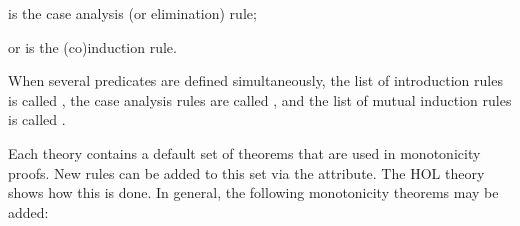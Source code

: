 \begin{isabellebody}
\begin{isamarkuptext}
\begin{description}
  \item {} is the case analysis (or elimination) rule;

  \item {} or  is the (co)induction
  rule.

  \end{description}

  When several predicates  are
  defined simultaneously, the list of introduction rules is called
  , the case analysis rules are
  called , and the list
  of mutual induction rules is called .%
\end{isamarkuptext}%
\isamarkuptrue%
%
\isamarkuptrue%
%
\begin{isamarkuptext}%
Each theory contains a default set of theorems that are used in
  monotonicity proofs.  New rules can be added to this set via the
  \hyperlink{attribute.HOL.mono}{\mbox{}} attribute.  The HOL theory 
  shows how this is done.  In general, the following monotonicity
  theorems may be added:

  \begin{itemize}


\end{itemize}
\end{isamarkuptext}
\end{isabellebody}
